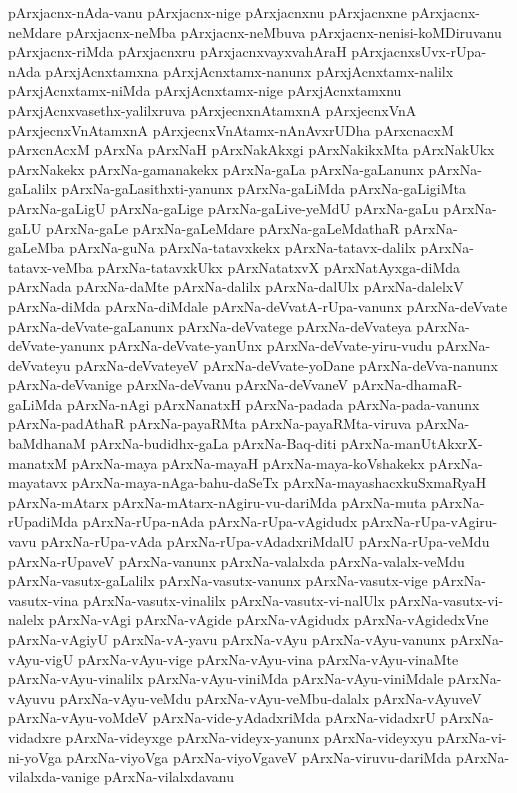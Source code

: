 {pArxjacnx-nAda-vanu
pArxjacnx-nige
pArxjacnxnu
pArxjacnxne
pArxjacnx-neMdare
pArxjacnx-neMba
pArxjacnx-neMbuva
pArxjacnx-nenisi-koMDiruvanu
pArxjacnx-riMda
pArxjacnxru
pArxjacnxvayxvahAraH
pArxjacnxsUvx-rUpa-nAda
pArxjAcnxtamxna
pArxjAcnxtamx-nanunx
pArxjAcnxtamx-nalilx
pArxjAcnxtamx-niMda
pArxjAcnxtamx-nige
pArxjAcnxtamxnu
pArxjAcnxvasethx-yalilxruva
pArxjecnxnAtamxnA
pArxjecnxVnA
pArxjecnxVnAtamxnA
pArxjecnxVnAtamx-nAnAvxrUDha
pArxcnacxM
pArxcnAcxM
pArxNa
pArxNaH
pArxNakAkxgi
pArxNakikxMta
pArxNakUkx
pArxNakekx
pArxNa-gamanakekx
pArxNa-gaLa
pArxNa-gaLanunx
pArxNa-gaLalilx
pArxNa-gaLasithxti-yanunx
pArxNa-gaLiMda
pArxNa-gaLigiMta
pArxNa-gaLigU
pArxNa-gaLige
pArxNa-gaLive-yeMdU
pArxNa-gaLu
pArxNa-gaLU
pArxNa-gaLe
pArxNa-gaLeMdare
pArxNa-gaLeMdathaR
pArxNa-gaLeMba
pArxNa-guNa
pArxNa-tatavxkekx
pArxNa-tatavx-dalilx
pArxNa-tatavx-veMba
pArxNa-tatavxkUkx
pArxNatatxvX
pArxNatAyxga-diMda
pArxNada
pArxNa-daMte
pArxNa-dalilx
pArxNa-dalUlx
pArxNa-dalelxV
pArxNa-diMda
pArxNa-diMdale
pArxNa-deVvatA-rUpa-vanunx
pArxNa-deVvate
pArxNa-deVvate-gaLanunx
pArxNa-deVvatege
pArxNa-deVvateya
pArxNa-deVvate-yanunx
pArxNa-deVvate-yanUnx
pArxNa-deVvate-yiru-vudu
pArxNa-deVvateyu
pArxNa-deVvateyeV
pArxNa-deVvate-yoDane
pArxNa-deVva-nanunx
pArxNa-deVvanige
pArxNa-deVvanu
pArxNa-deVvaneV
pArxNa-dhamaR-gaLiMda
pArxNa-nAgi
pArxNanatxH
pArxNa-padada
pArxNa-pada-vanunx
pArxNa-padAthaR
pArxNa-payaRMta
pArxNa-payaRMta-viruva
pArxNa-baMdhanaM
pArxNa-budidhx-gaLa
pArxNa-Baq-diti
pArxNa-manUtAkxrX-manatxM
pArxNa-maya
pArxNa-mayaH
pArxNa-maya-koVshakekx
pArxNa-mayatavx
pArxNa-maya-nAga-bahu-daSeTx
pArxNa-mayashacxkuSxmaRyaH
pArxNa-mAtarx
pArxNa-mAtarx-nAgiru-vu-dariMda
pArxNa-muta
pArxNa-rUpadiMda
pArxNa-rUpa-nAda
pArxNa-rUpa-vAgidudx
pArxNa-rUpa-vAgiru-vavu
pArxNa-rUpa-vAda
pArxNa-rUpa-vAdadxriMdalU
pArxNa-rUpa-veMdu
pArxNa-rUpaveV
pArxNa-vanunx
pArxNa-valalxda
pArxNa-valalx-veMdu
pArxNa-vasutx-gaLalilx
pArxNa-vasutx-vanunx
pArxNa-vasutx-vige
pArxNa-vasutx-vina
pArxNa-vasutx-vinalilx
pArxNa-vasutx-vi-nalUlx
pArxNa-vasutx-vi-nalelx
pArxNa-vAgi
pArxNa-vAgide
pArxNa-vAgidudx
pArxNa-vAgidedxVne
pArxNa-vAgiyU
pArxNa-vA-yavu
pArxNa-vAyu
pArxNa-vAyu-vanunx
pArxNa-vAyu-vigU
pArxNa-vAyu-vige
pArxNa-vAyu-vina
pArxNa-vAyu-vinaMte
pArxNa-vAyu-vinalilx
pArxNa-vAyu-viniMda
pArxNa-vAyu-viniMdale
pArxNa-vAyuvu
pArxNa-vAyu-veMdu
pArxNa-vAyu-veMbu-dalalx
pArxNa-vAyuveV
pArxNa-vAyu-voMdeV
pArxNa-vide-yAdadxriMda
pArxNa-vidadxrU
pArxNa-vidadxre
pArxNa-videyxge
pArxNa-videyx-yanunx
pArxNa-videyxyu
pArxNa-vi-ni-yoVga
pArxNa-viyoVga
pArxNa-viyoVgaveV
pArxNa-viruvu-dariMda
pArxNa-vilalxda-vanige
pArxNa-vilalxdavanu
}
